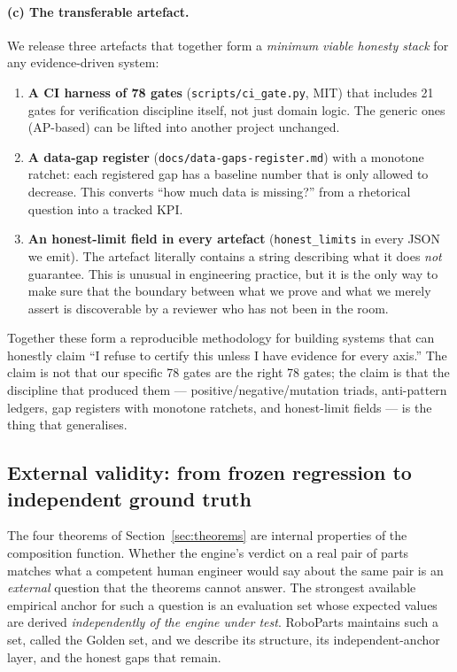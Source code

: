 \documentclass[review]{elsarticle}
\begin{document}
\paragraph{(c) The transferable artefact.}
We release three artefacts that together form a
\emph{minimum viable honesty stack} for any evidence-driven system:

\begin{enumerate}
\item \textbf{A CI harness of 78 gates} (\texttt{scripts/ci\_gate.py},
MIT) that includes 21 gates for verification discipline itself, not
just domain logic. The generic ones (AP-based) can be lifted into
another project unchanged.
\item \textbf{A data-gap register} (\texttt{docs/data-gaps-register.md})
with a monotone ratchet: each registered gap has a baseline number
that is only allowed to decrease. This converts ``how much data is
missing?'' from a rhetorical question into a tracked KPI.
\item \textbf{An honest-limit field in every artefact}
(\texttt{honest\_limits} in every JSON we emit). The artefact
literally contains a string describing what it does \emph{not}
guarantee. This is unusual in engineering practice, but it is the
only way to make sure that the boundary between what we prove and
what we merely assert is discoverable by a reviewer who has not been
in the room.
\end{enumerate}

Together these form a reproducible methodology for building systems
that can honestly claim ``I refuse to certify this unless I have
evidence for every axis.'' The claim is not that our specific 78
gates are the right 78 gates; the claim is that the discipline that
produced them --- positive/negative/mutation triads, anti-pattern
ledgers, gap registers with monotone ratchets, and honest-limit
fields --- is the thing that generalises.

\subsection{External validity: from frozen regression to independent ground truth}\label{sec:external-validity}

The four theorems of Section~\ref{sec:theorems} are internal
properties of the composition function. Whether the engine's verdict
on a real pair of parts matches what a competent human engineer would
say about the same pair is an \emph{external} question that the
theorems cannot answer. The strongest available empirical anchor for
such a question is an evaluation set whose expected values are derived
\emph{independently of the engine under test}. RoboParts maintains
such a set, called the Golden set, and we describe its structure,
its independent-anchor layer, and the honest gaps that remain.
\end{document}
